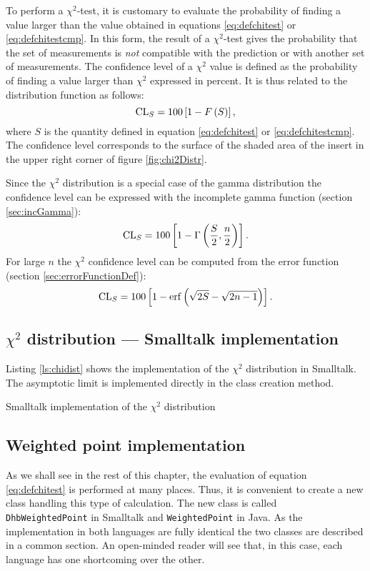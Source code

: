 \documentclass[twoside]{book}
\begin{document}
To perform a $\chi^2$-test, it is customary to evaluate the
probability of finding a value larger than the value obtained in
equations \ref{eq:defchitest} or \ref{eq:defchitestcmp}. In this
form, the result of a $\chi^2$-test gives the probability that the
set of measurements is {\sl not} compatible with the prediction or
with another set of measurements. The confidence level of a
$\chi^2$ value is defined as the probability of finding a value
larger than $\chi^2$ expressed in percent. It is thus related to
the distribution function as follows:
\begin{equation}
  {\mathop{\rm CL}}_{S}=100\left[ 1-F\left(S\right)\right],
\end{equation}
where $S$ is the quantity defined in equation \ref{eq:defchitest}
or \ref{eq:defchitestcmp}. The confidence level corresponds to the
surface of the shaded area of the insert in the upper right corner
of figure \ref{fig:chi2Distr}.

Since the $\chi^2$ distribution is a special case of the gamma
distribution the confidence level can be expressed with the
incomplete gamma function (\cf section \ref{sec:incGamma}):
\begin{equation}
\label{eq:chiTest}
  {\mathop{\rm CL}}_{S}=100\left[ 1-\Gamma\left({S \over 2},{n\over 2}\right)\right].
\end{equation}
For large $n$ the $\chi^2$ confidence level can be computed from
the error function (\cf section \ref{sec:errorFunctionDef}):
\begin{equation}
\label{eq:chiTestAsymp}
  {\mathop{\rm CL}}_{S}=100\left[ 1-\mathop{\rm erf}\left(\sqrt{2S}-\sqrt{2n-1}\right)\right].
\end{equation}

\subsection{$\chi^2$ distribution --- Smalltalk implementation}
 Listing \ref{ls:chidist} shows
the implementation of the $\chi^2$ distribution in Smalltalk. The
asymptotic limit is implemented directly in the class creation
method.
\begin{listing} Smalltalk implementation of the $\chi^2$ distribution \label{ls:chidist}

\end{listing}


\subsection{Weighted point implementation}
\label{sec:weightedPoint}  As we shall see in the rest of this chapter, the
evaluation of equation \ref{eq:defchitest} is performed at many
places. Thus, it is convenient to create a new class handling this
type of calculation. The new class is called {\tt
DhbWeightedPoint} in Smalltalk and {\tt WeightedPoint} in Java. As
the implementation in both languages are fully identical the two
classes are described in a common section. An open-minded reader
will see that, in this case, each language has one shortcoming
over the other.
\end{document}
